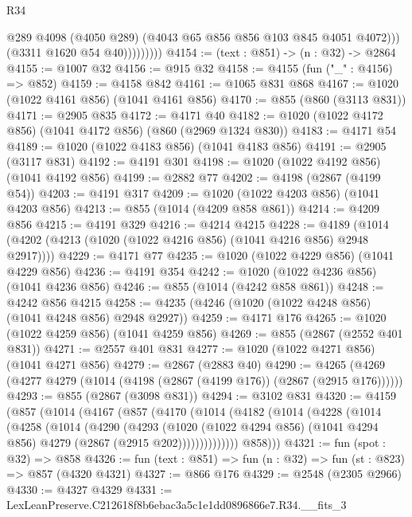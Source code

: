 \begin{lexlean}{R34}
\begin{coremodule}
                        @289
                        @4098
                        (@4050 @289)
                        (@4043 @65 @856 @856 @103 @845 @4051 @4072)))
                    (@3311 @1620 @54 @40)))))))))
@4154 := (text : @851) -> (n : @32) -> @2864
@4155 := @1007 @32
@4156 := @915 @32
@4158 := @4155 (fun ("_" : @4156) => @852)
@4159 := @4158 @842
@4161 := @1065 @831 @868
@4167 := @1020 (@1022 @4161 @856) (@1041 @4161 @856)
@4170 := @855 (@860 (@3113 @831))
@4171 := @2905 @835
@4172 := @4171 @40
@4182 := @1020 (@1022 @4172 @856) (@1041 @4172 @856) (@860 (@2969 @1324 @830))
@4183 := @4171 @54
@4189 := @1020 (@1022 @4183 @856) (@1041 @4183 @856)
@4191 := @2905 (@3117 @831)
@4192 := @4191 @301
@4198 := @1020 (@1022 @4192 @856) (@1041 @4192 @856)
@4199 := @2882 @77
@4202 := @4198 (@2867 (@4199 @54))
@4203 := @4191 @317
@4209 := @1020 (@1022 @4203 @856) (@1041 @4203 @856)
@4213 := @855 (@1014 (@4209 @858 @861))
@4214 := @4209 @856
@4215 := @4191 @329
@4216 := @4214 @4215
@4228 := @4189 (@1014 (@4202 (@4213 (@1020 (@1022 @4216 @856) (@1041 @4216 @856) @2948 @2917))))
@4229 := @4171 @77
@4235 := @1020 (@1022 @4229 @856) (@1041 @4229 @856)
@4236 := @4191 @354
@4242 := @1020 (@1022 @4236 @856) (@1041 @4236 @856)
@4246 := @855 (@1014 (@4242 @858 @861))
@4248 := @4242 @856 @4215
@4258 := @4235 (@4246 (@1020 (@1022 @4248 @856) (@1041 @4248 @856) @2948 @2927))
@4259 := @4171 @176
@4265 := @1020 (@1022 @4259 @856) (@1041 @4259 @856)
@4269 := @855 (@2867 (@2552 @401 @831))
@4271 := @2557 @401 @831
@4277 := @1020 (@1022 @4271 @856) (@1041 @4271 @856)
@4279 := @2867 (@2883 @40)
@4290 := @4265 (@4269 (@4277 @4279 (@1014 (@4198 (@2867 (@4199 @176)) (@2867 (@2915 @176))))))
@4293 := @855 (@2867 (@3098 @831))
@4294 := @3102 @831
@4320 := @4159
    (@857
      (@1014
        (@4167
          (@857
            (@4170
              (@1014
                (@4182
                  (@1014
                    (@4228
                      (@1014
                        (@4258
                          (@1014
                            (@4290
                              (@4293
                                (@1020
                                  (@1022 @4294 @856)
                                  (@1041 @4294 @856)
                                  @4279
                                  (@2867 (@2915 @202))))))))))))))
          @858)))
@4321 := fun (spot : @32) => @858
@4326 := fun (text : @851) => fun (n : @32) => fun (st : @823) => @857 (@4320 @4321)
@4327 := @866 @176
@4329 := @2548 (@2305 @2966)
@4330 := @4327 @4329
@4331 := LexLeanPreserve.C212618f8b6ebac3a5c1e1dd0896866e7.R34.__fits_3

\end{coremodule}
\end{lexlean}
